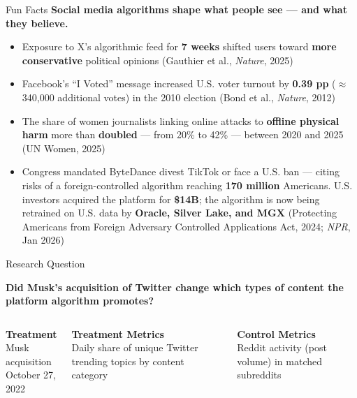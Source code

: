 \documentclass[aspectratio=169,t]{beamer}
\newcommand{\orange}[1]{\textcolor{uteporange}{\textbf{#1}}}
\newcommand{\gray}[1]{\textcolor{utepsilver}{#1}}
\begin{document}
\begin{frame}{Fun Facts}
{\color{utepblue}\bfseries Social media algorithms shape what people see — and what they believe.}
\vspace{0.4em}
\begin{itemize}\setlength\itemsep{0.40em}
  \item Exposure to X's algorithmic feed for \orange{7 weeks} shifted users toward
        \orange{more conservative} political opinions
        \gray{\scriptsize(Gauthier et al., \textit{Nature}, 2025)}

  \item Facebook's ``I Voted'' message increased U.S. voter turnout by
        \orange{0.39 pp} ($\approx$340{,}000 additional votes) in the 2010 election
        \gray{\scriptsize(Bond et al., \textit{Nature}, 2012)}

  \item The share of women journalists linking online attacks to \orange{offline physical harm}
        more than \orange{doubled} — from 20\% to 42\% — between 2020 and 2025
        \gray{\scriptsize(UN Women, 2025)}

  \item Congress mandated ByteDance divest TikTok or face a U.S. ban — citing risks
        of a foreign-controlled algorithm reaching \orange{170 million} Americans.
        U.S. investors acquired the platform for \orange{\$14B}; the algorithm is now
        being retrained on U.S. data by \orange{Oracle, Silver Lake, and MGX}
        \gray{\scriptsize(Protecting Americans from Foreign Adversary Controlled Applications Act, 2024; \textit{NPR}, Jan 2026)}
\end{itemize}
\end{frame}

\begin{frame}{Research Question}
\vspace{0.4em}
\begin{block}{}
  \centering\large\bfseries
  Did Musk's acquisition of Twitter change which types of content the platform algorithm promotes?
\end{block}

\vspace{1em}
\begin{columns}[T]
    \centering
    \orange{Treatment}\\[0.3em]
    \small Musk acquisition\\October 27, 2022

    \centering
    \orange{Treatment Metrics}\\[0.3em]
    \small Daily share of unique Twitter trending topics by content category

    \centering
    \orange{Control Metrics}\\[0.3em]
    \small Reddit activity (post volume) in matched subreddits
\end{columns}
\end{frame}
\end{document}
